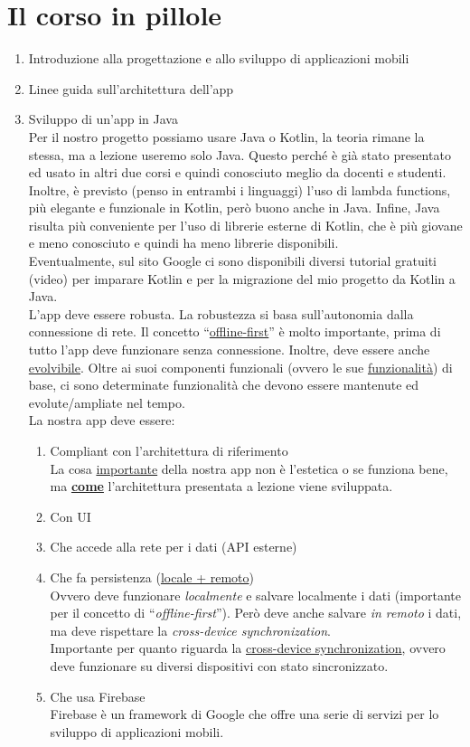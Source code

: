 \section{Il corso in pillole}
\begin{enumerate}
    \item Introduzione alla progettazione e allo sviluppo di applicazioni mobili
    \item Linee guida sull'architettura dell'app
    \item Sviluppo di un'app in Java\\
    Per il nostro progetto possiamo usare Java o Kotlin, la teoria rimane la stessa, ma a lezione useremo solo Java. Questo perché è già stato presentato ed usato in altri due corsi e quindi conosciuto meglio da docenti e studenti. Inoltre, è previsto (penso in entrambi i linguaggi) l'uso di lambda functions, più elegante e funzionale in Kotlin, però buono anche in Java. Infine, Java risulta più conveniente per l'uso di librerie esterne di Kotlin, che è più giovane e meno conosciuto e quindi ha meno librerie disponibili.\\
    Eventualmente, sul sito Google ci sono disponibili diversi tutorial gratuiti (video) per imparare Kotlin e per la migrazione del mio progetto da Kotlin a Java.\\
    L'app deve essere robusta. La robustezza si basa sull'autonomia dalla connessione di rete. Il concetto ``\underline{offline-first}'' è molto importante, prima di tutto l'app deve funzionare senza connessione. Inoltre, deve essere anche \underline{evolvibile}. Oltre ai suoi componenti funzionali (ovvero le sue \underline{funzionalità}) di base, ci sono determinate funzionalità che devono essere mantenute ed evolute/ampliate nel tempo.\\
    La nostra app deve essere:
    \begin{enumerate}
        \item Compliant con l'architettura di riferimento\\
        La cosa \underline{importante} della nostra app non è l'estetica o se funziona bene, ma \textbf{\underline{come}} l'architettura presentata a lezione viene sviluppata.
        \item Con UI
        \item Che accede alla rete per i dati (API esterne)
        \item Che fa persistenza (\underline{locale + remoto})\\
        Ovvero deve funzionare \textit{localmente} e salvare localmente i dati (importante per il concetto di ``\textit{offline-first}''). Però deve anche salvare \textit{in remoto} i dati, ma deve rispettare la \textit{cross-device synchronization}.\\
        Importante per quanto riguarda la \underline{cross-device synchronization}, ovvero deve funzionare su diversi dispositivi con stato sincronizzato.
        \item Che usa Firebase\\
        Firebase è un framework di Google che offre una serie di servizi per lo sviluppo di applicazioni mobili.
    \end{enumerate}
\end{enumerate}


